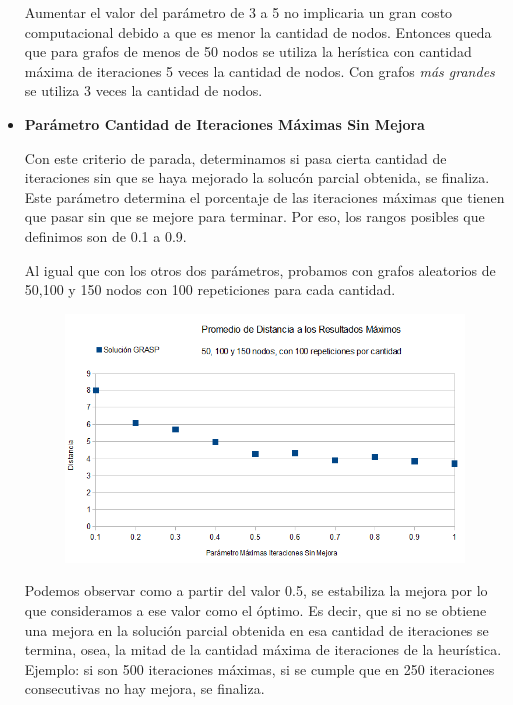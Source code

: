 \begin{itemize}
\quad Aumentar el valor del parámetro de 3 a 5 no implicaria un gran costo computacional debido a que es menor la cantidad de nodos. Entonces queda que para grafos de menos de 50 nodos se utiliza la herística con cantidad máxima de iteraciones 5 veces la cantidad de nodos. Con grafos \textit{más grandes} se utiliza 3 veces la cantidad de nodos.

\item \textbf{Parámetro Cantidad de Iteraciones Máximas Sin Mejora}

\quad

\quad Con este criterio de parada, determinamos si pasa cierta cantidad de iteraciones sin que se haya mejorado la solucón parcial obtenida, se finaliza. Este parámetro determina el porcentaje de las iteraciones máximas que tienen que pasar sin que se mejore para terminar. Por eso, los rangos posibles que definimos son de 0.1 a 0.9.

\quad Al igual que con los otros dos parámetros, probamos con grafos aleatorios de 50,100 y 150 nodos con 100 repeticiones para cada cantidad.

\begin{figure}[H]
	\centering
	\includegraphics[scale=0.6]{optimizacionGRASPParIterMaxSinMejora.png}
\end{figure}

\quad Podemos observar como a partir del valor 0.5, se estabiliza la mejora por lo que consideramos a ese valor como el óptimo. Es decir, que si no se obtiene una mejora en la solución parcial obtenida en esa cantidad de iteraciones se termina, osea, la mitad de la cantidad máxima de iteraciones de la heurística. Ejemplo: si son 500 iteraciones máximas, si se cumple que en 250 iteraciones consecutivas no hay mejora, se finaliza.

\end{itemize}

